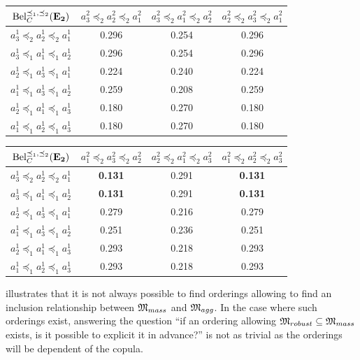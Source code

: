 \begin{example}
\begin{center}
\begin{tabular}{|c||c|c|c|}
\hline
$\mathrm{Bel}^{\preceq_1,\preceq_2}_C(\mathbf{E_2})$ & $a^2_3\preceq_2a^2_2\preceq_2a^2_1$ & $a^2_3\preceq_2a^2_1\preceq_2a^2_2$ & $a^2_2\preceq_2a^2_3\preceq_2a^2_1$ \\ \hline\hline
$a^1_3\preceq_2a^1_2\preceq_2a^1_1$ & 0.296 & 0.254 & 0.296 \\ \hline
$a^1_3\preceq_1a^1_1\preceq_1a^1_2$ & 0.296 & 0.254 & 0.296 \\ \hline
$a^1_2\preceq_1a^1_3\preceq_1a^1_1$ & 0.224 & 0.240 & 0.224 \\ \hline
$a^1_1\preceq_1a^1_3\preceq_1a^1_2$ & 0.259 & 0.208 & 0.259 \\ \hline
$a^1_2\preceq_1a^1_1\preceq_1a^1_3$ & 0.180 & 0.270 & 0.180 \\ \hline
$a^1_1\preceq_1a^1_2\preceq_1a^1_3$ & 0.180 & 0.270 & 0.180 \\ \hline
\end{tabular}

\vspace{0.5cm}

\begin{tabular}{|c||c|c|c|}
\hline
$\mathrm{Bel}^{\preceq_1,\preceq_2}_C(\mathbf{E_2})$ & $a^2_1\preceq_2a^2_3\preceq_2a^2_2$ & $a^2_2\preceq_2a^2_1\preceq_2a^2_3$ & $a^2_1\preceq_2a^2_2\preceq_2a^2_3$ \\ \hline\hline
$a^1_3\preceq_2a^1_2\preceq_2a^1_1$ & \textbf{0.131} & 0.291 & \textbf{0.131} \\ \hline
$a^1_3\preceq_1a^1_1\preceq_1a^1_2$ & \textbf{0.131} & 0.291 & \textbf{0.131} \\ \hline
$a^1_2\preceq_1a^1_3\preceq_1a^1_1$ & 0.279 & 0.216 & 0.279 \\ \hline
$a^1_1\preceq_1a^1_3\preceq_1a^1_2$ & 0.251 & 0.236 & 0.251 \\ \hline
$a^1_2\preceq_1a^1_1\preceq_1a^1_3$ & 0.293 & 0.218 & 0.293 \\ \hline
$a^1_1\preceq_1a^1_2\preceq_1a^1_3$ & 0.293 & 0.218 & 0.293 \\ \hline
\end{tabular}
\label{tab:beliefs_orders}
\end{center}
\end{example}
 illustrates that it is not always possible to find orderings allowing to find an inclusion relationship between  $\mathfrak{M}_{mass}$ and $\mathfrak{M}_{agg}$. In the case where such orderings exist, answering the question ``if an ordering allowing $\mathfrak{M}_{robust}\subseteq\mathfrak{M}_{mass}$ exists, is it possible to explicit it in advance?'' is not as trivial as the orderings will be dependent of the copula.

